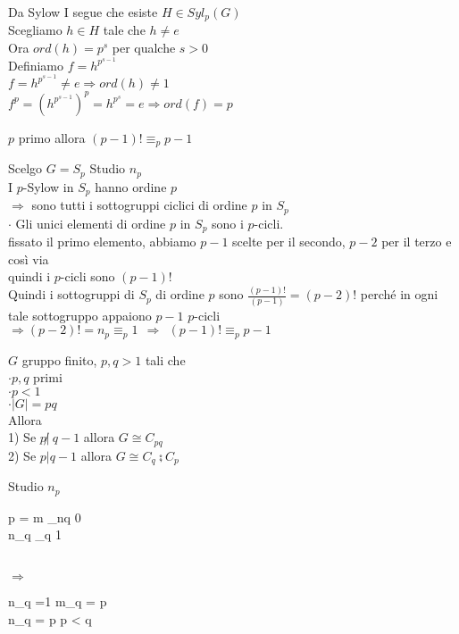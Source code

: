 \documentclass[12px]{article}
\begin{document}
{\begin{dimo}
\begin{teo}[Cauchy]
	\end{teo}
	\begin{dimo}
		Da Sylow I segue che esiste $H\in Syl_p(G)$ \\
		Scegliamo $h\in H$ tale che  $h\neq e$\\
		Ora  $ord(h) = p^s$ per qualche $s>0$\\
		Definiamo $f = h^{p^{s-1}}$\\
		 $f = h^{p^{s-1}}\neq e \Rightarrow ord(h)\neq 1$ \\
		 $f^p = (h^{p^{s-1}})^p = h^{p^s} = e \Rightarrow ord(f) = p$
	\end{dimo}
	\begin{teo}[Wilson]
		$p$ primo allora $(p-1)!\equiv_p p-1$
	\end{teo}
	\begin{dimo}
		Scelgo $G= S_p$ Studio $n_p$\\
		I  $p$-Sylow in $S_p$ hanno ordine $p$\\
		 $ \Rightarrow$ sono tutti i sottogruppi ciclici di ordine $p$ in $S_p$\\
		 $\cdot$ Gli unici elementi di ordine  $p$ in $S_p$ sono i $p$-cicli.\\
		 fissato il primo elemento, abbiamo $p-1$ scelte per il secondo, $p-2$ per il terzo e così via\\
		 quindi i $p$-cicli sono $ (p-1)!$\\
		 Quindi i sottogruppi di $S_p$ di ordine $p$ sono $\frac{(p-1)!}{(p-1)} = (p-2)!$ perché in ogni tale sottogruppo appaiono  $p-1$ $p$-cicli\\
		 $ \Rightarrow (p-2)! = n_p \equiv_p 1 \ \ \Rightarrow \ \ (p-1)! \equiv_p p-1$
	\end{dimo}
	\begin{teo}
		$G$ gruppo finito, $p,q > 1$ tali che \\
		 $\cdot p,q$ primi\\
		 $\cdot p < 1$\\
		  $\cdot|G| = pq$ \\
		  Allora\\
		  1) Se $p\not | \ q-1$ allora  $G\cong C_{pq}$\\
		  2) Se  $p | q-1$ allora  $G\cong C_q\semi C_p$
	\end{teo}
	\begin{dimo}
		Studio $n_p$ \\
		\begin{cases}
			p = m \equiv_{nq} 0\\
			n_q \equiv_q 1
		\end{cases}\\
		$ \Rightarrow $ \begin{cases}
			n_q =1  m_q = p\\
			 n_q = p \text{ perchè } p < q


\end{cases}
\end{dimo}
\end{dimo}}
\end{document}
